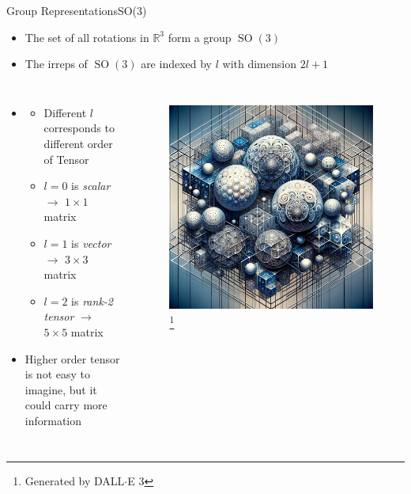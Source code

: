\documentclass[pdf,serif]{beamer}
\newcommand{\empy}[1]{{\color{BerkeleyGold}\emph{#1}}}
\begin{document}
\begin{frame}{Group Representations}{SO(3)}
    \begin{itemize}
        \item The set of all rotations in $\mathbb R^3$ form a group $\operatorname{SO}(3)$
        \item The irreps of $\operatorname{SO}(3)$ are indexed by $l$ with dimension $2l+1$
    \end{itemize}
    \vspace*{0.75em}
    \begin{columns}[onlytextwidth]
        \begin{itemize}\itemsep=0.5em
            \item[]
            \begin{itemize}\itemsep=0.5em
                \item Different $l$ corresponds to different order of Tensor
                \item $l=0$ is \empy{scalar} $\to$ $1 \times 1$ matrix
                \item $l=1$ is \empy{vector} $\to$ $3 \times 3$ matrix
                \item $l=2$ is \empy{rank-2 tensor} $\to$ $5 \times 5$ matrix
            \end{itemize}
            \item Higher order tensor is not easy to imagine, but it could carry more information
        \end{itemize}
            \begin{figure}
                \includegraphics[width=\linewidth]{images/irreps.png}\footnote[frame]{Generated by DALL$\cdot$E 3}
            \end{figure}
    \end{columns}
    
\end{frame}
\end{document}
